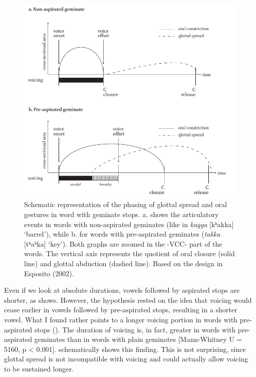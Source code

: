 \documentclass[11pt,a4paper,oneside,openany]{memoir}\usepackage[]{graphicx}\usepackage[]{color}
\begin{document}
\begin{figure}
\centering
\includegraphics[width=\textwidth]{reality}
\caption[Schematic representation of the phasing of glottal spread and oral gestures in word with geminate stops.]{Schematic representation of the phasing of glottal spread and oral gestures in word with geminate stops. a. shows the articulatory events in words with non-aspirated geminates (like in \textit{kagga} [kʰakka] `barrel'), while b. for words with pre-aspirated geminates (\textit{takka} [tʰaʰka] `key').
Both graphs are zoomed in the -VCC- part of the words.
The vertical axis represents the quotient of oral closure (solid line) and glottal abduction (dashed line).
Based on the design in Esposito (2002).}
\label{f:reality}
\end{figure}

Even if we look at absolute durations, vowels followed by aspirated stops are shorter, as  shows.
However, the hypothesis rested on the idea that voicing would cease earlier in vowels followed by pre-aspirated stops, resulting in a shorter vowel.
What I found rather points to a longer voicing portion in words with pre-aspirated stops ().
The duration of voicing is, in fact, greater in words with pre-aspirated geminates than in words with plain geminates [Mann-Whitney U = 5160, p < 0.001].
 schematically shows this finding.
This is not surprising, since glottal spread is not incompatible with voicing and could actually allow voicing to be sustained longer.
\end{document}
